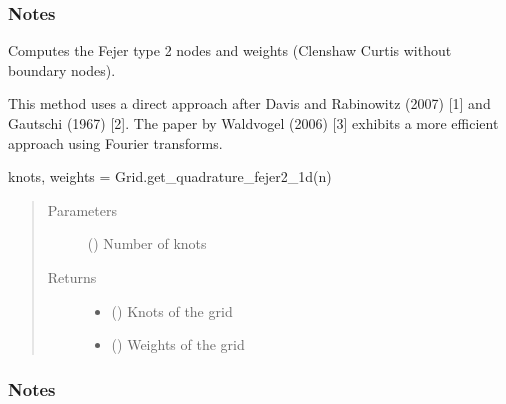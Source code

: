 \documentclass[letterpaper,10pt,english,openany,oneside]{sphinxmanual}
\begin{document}
\begin{fulllineitems}
\begin{fulllineitems}
\subsubsection*{Notes}

\end{fulllineitems}


\begin{fulllineitems}
\label{\detokenize{pygpc:pygpc.Grid.Grid.get_quadrature_fejer2_1d}}
Computes the Fejer type 2 nodes and weights (Clenshaw Curtis without boundary nodes).

This method uses a direct approach after Davis and Rabinowitz (2007) {[}1{]} and Gautschi (1967) {[}2{]}.
The paper by Waldvogel (2006) {[}3{]} exhibits a more efficient approach using Fourier transforms.

knots, weights = Grid.get\_quadrature\_fejer2\_1d(n)
\begin{quote}\begin{description}
\item[{Parameters}] \leavevmode
{} () \textendash{} Number of knots

\item[{Returns}] \leavevmode
\begin{itemize}
\item {} 
 () \textendash{} Knots of the grid

\item {} 
 () \textendash{} Weights of the grid

\end{itemize}


\end{description}\end{quote}
\subsubsection*{Notes}

\end{fulllineitems}



\end{fulllineitems}
\end{document}
